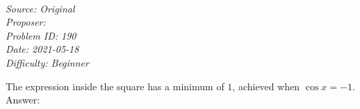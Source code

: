 \SSbreak\\
\emph{Source: Original}\\
\emph{Proposer: \Pnjoy}\\ %
\emph{Problem ID: 190}\\
\emph{Date: 2021-05-18}\\
\emph{Difficulty: Beginner}\\
\SSbreak

\bigskip

\begin{solution}\hfil\medskip
  
    The expression inside the square has a minimum of $1$, achieved when $\cos x = -1.$ Answer: 
\end{solution}\bigskip
